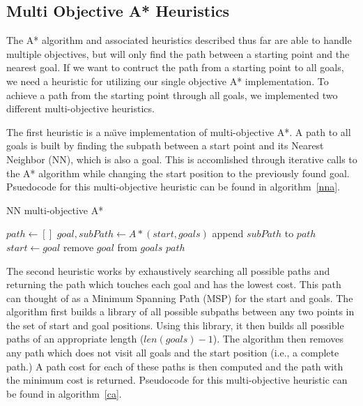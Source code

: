 \documentclass[12pt, conference, compsocconf]{IEEEtran}
\begin{document}
\subsection{Multi Objective A* Heuristics}
The A* algorithm and associated heuristics described thus far are able to
handle multiple objectives, but will only find the path between a starting
point and the nearest goal. If we want to contruct the path from a starting
point to all goals, we need a heuristic for utilizing our single objective A*
implementation.  To achieve a path from the starting point through all goals,
we implemented two different multi-objective heuristics.

The first heuristic is a na\"{\i}ve implementation of multi-objective A*.  A
path to all goals is built by finding the subpath between a start point and its
Nearest Neighbor (NN), which is also a goal.  This is accomlished through
iterative calls to the A* algorithm while changing the start position to the
previously found goal.  Psuedocode for this multi-objective heuristic can be
found in algorithm~\ref{nna}.

\begin{algorithm}
    \caption{NN multi-objective A*}
    \label{nna}
    \begin{algorithmic}[1]
        \State $path\gets []$
        \State $goal, subPath\gets A*(start, goals)$
        \State append $subPath$ to $path$
        \State $start\gets goal$
        \State remove $goal$ from $goals$
        \EndWhile
        \Return $path$
        \EndProcedure
    \end{algorithmic}
\end{algorithm}

The second heuristic works by exhaustively searching all possible paths and
returning the path which touches each goal and has the lowest cost.  This path
can thought of as a Minimum Spanning Path (MSP) for the start and goals.  The
algorithm first builds a library of all possible subpaths between any two
points in the set of start and goal positions.  Using this library, it then
builds all possible paths of an appropriate length ($len(goals)-1$).  The
algorithm then removes any path which does not visit all goals and the start
position (i.e., a complete path.)  A path cost for each of these paths is then
computed and the path with the minimum cost is returned.  Pseudocode for this
multi-objective heuristic can be found in algorithm~\ref{ca}.
\end{document}
